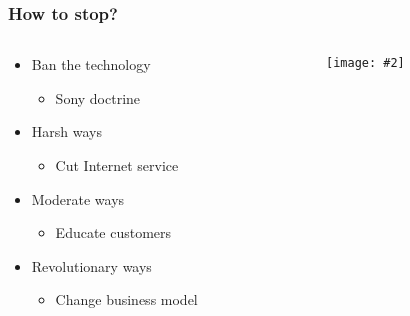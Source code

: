 \documentclass[mathserif,serif,14pt,aspectratio=169]{beamer}
\newcommand{\pic}[2]{
	\centerline{\texttt{[image: \#2]}}
}
\begin{document}
\begin{frame}
	\frametitle{How to stop?}
	\begin{columns}
		\begin{column}{0.5\textwidth}
			\begin{itemize}\setlength\itemsep{0.5em}
			\item<2-> Ban the technology
				\begin{itemize}
				\item<3-> Sony doctrine
				\end{itemize}
			\item<4-> Harsh ways
				\begin{itemize}
				\item<4-> Cut Internet service
				\end{itemize}
			\item<5-> Moderate ways
				\begin{itemize}
				\item<5-> Educate customers
				\end{itemize}
			\item<6-> Revolutionary ways
				\begin{itemize}
				\item<6-> Change business model
				\end{itemize}
			\end{itemize}
		\end{column}
		\begin{column}{0.5\textwidth}
			\pic{0.05}{assets/stop.pdf}
		\end{column}
	\end{columns}

\end{frame}
\end{document}
